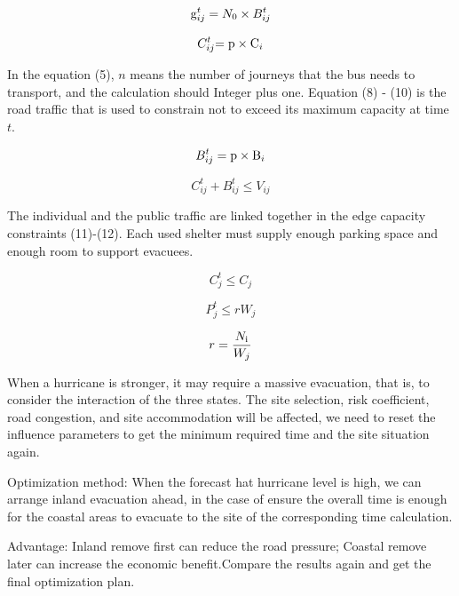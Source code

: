 \documentclass{mcmthesis}
\begin{document}
\begin{equation}\label{9}
{\rm{g}}_{ij}^t = {N_0} \times B_{ij}^t
\end{equation}

\begin{equation}\label{10}
C_{ij}^t{\rm{ = p}} \times {{\rm{C}}_i}
\end{equation}

In the equation (5), $n$ means the number of journeys that the bus needs to transport, and the calculation should Integer plus one. Equation (8) - (10) is the road traffic that is used to constrain not to exceed its maximum capacity at time $t$.

\begin{equation}\label{11}
B_{ij}^t = {\rm{p}} \times {{\rm{B}}_i}
\end{equation}

\begin{equation}\label{12}
C_{ij}^t + B_{ij}^t \le {V_{ij}}
\end{equation}

The individual and the public traffic are linked together in the edge capacity constraints (11)-(12). Each used shelter must supply enough parking space and enough room to support evacuees.

\begin{equation}\label{13}
C_j^t \le {C_j}
\end{equation}

\begin{equation}\label{14}
P_j^t \le r{W_j}
\end{equation}

\begin{equation}\label{15}
r = \frac{{{N_{\rm{i}}}}}{{{W_j}}}
\end{equation}

When a hurricane is stronger, it may require a massive evacuation, that is, to consider the interaction of the three states. The site selection, risk coefficient, road congestion, and site accommodation will be affected, we need to reset the influence parameters to get the minimum required time and the site situation again.

Optimization method: When the forecast hat hurricane level is high, we can arrange inland evacuation ahead, in the case of ensure the overall time is enough for the coastal areas to evacuate to the site of the corresponding time calculation.

Advantage: Inland remove first can reduce the road pressure; Coastal remove later can increase the economic benefit.Compare the results again and get the final optimization plan.
\end{document}
